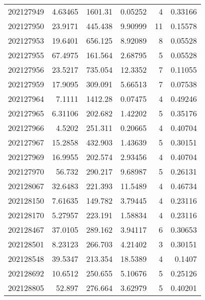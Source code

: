 \begin{tabular}{rrrrrr}
 202127949 &          4.63465 &     1601.31   &            0.05252 &           4 & 0.33166 \\
 202127950 &         23.9171  &      445.438  &            9.90999 &          11 & 0.15578 \\
 202127953 &         19.6401  &      656.125  &            8.92089 &           8 & 0.05528 \\
 202127955 &         67.4975  &      161.564  &            2.68795 &           5 & 0.05528 \\
 202127956 &         23.5217  &      735.054  &           12.3352  &           7 & 0.11055 \\
 202127959 &         17.9095  &      309.091  &            5.66513 &           7 & 0.07538 \\
 202127964 &          7.1111  &     1412.28   &            0.07475 &           4 & 0.49246 \\
 202127965 &          6.31106 &      202.682  &            1.42202 &           5 & 0.35176 \\
 202127966 &          4.5202  &      251.311  &            0.20665 &           4 & 0.40704 \\
 202127967 &         15.2858  &      432.903  &            1.43639 &           5 & 0.30151 \\
 202127969 &         16.9955  &      202.574  &            2.93456 &           4 & 0.40704 \\
 202127970 &         56.732   &      290.217  &            9.68987 &           5 & 0.26131 \\
 202128067 &         32.6483  &      221.393  &           11.5489  &           4 & 0.46734 \\
 202128150 &          7.61635 &      149.782  &            3.79445 &           4 & 0.23116 \\
 202128170 &          5.27957 &      223.191  &            1.58834 &           4 & 0.23116 \\
 202128467 &         37.0105  &      289.162  &            3.94117 &           6 & 0.30653 \\
 202128501 &          8.23123 &      266.703  &            4.21402 &           3 & 0.30151 \\
 202128548 &         39.5347  &      213.354  &           18.5389  &           4 & 0.1407  \\
 202128692 &         10.6512  &      250.655  &            5.10676 &           5 & 0.25126 \\
 202128805 &         52.897   &      276.664  &            3.62979 &           5 & 0.40201 \\

\end{tabular}
